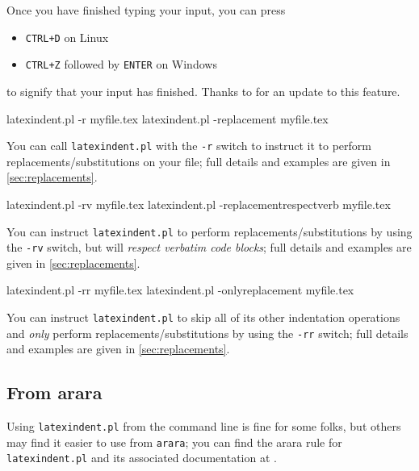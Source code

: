 	Once you have finished typing your input, you can press
	\begin{itemize}
		\item \texttt{CTRL+D} on Linux
		\item \texttt{CTRL+Z} followed by \texttt{ENTER} on Windows
	\end{itemize}
	to signify that your input has finished. Thanks to \cite{xu-cheng} for an update
	to this feature.
	\begin{commandshell}
latexindent.pl -r myfile.tex
latexindent.pl -replacement myfile.tex
\end{commandshell}
	You can%
	 call
	\texttt{latexindent.pl} with the \texttt{-r} switch to instruct it to perform
	replacements/substitutions on your file; full details and examples are given in
	\vref{sec:replacements}.

	\begin{commandshell}
latexindent.pl -rv myfile.tex
latexindent.pl -replacementrespectverb myfile.tex
\end{commandshell}
	You can%
	 instruct
	\texttt{latexindent.pl} to perform replacements/substitutions by using the
	\texttt{-rv} switch, but will \emph{respect verbatim code blocks}; full details and
	examples are given in \vref{sec:replacements}.

	\begin{commandshell}
latexindent.pl -rr myfile.tex
latexindent.pl -onlyreplacement myfile.tex
\end{commandshell}
	You can%
	 instruct
	\texttt{latexindent.pl} to skip all of its other indentation operations and
	\emph{only} perform replacements/substitutions by using the
	\texttt{-rr} switch; full details and examples are given in
	\vref{sec:replacements}.

\subsection{From arara}\label{sec:arara}
	Using \texttt{latexindent.pl} from the command line is fine for some folks, but others
	may find it easier to use from \texttt{arara}; you can find the arara rule for
	\texttt{latexindent.pl} and its associated documentation at \cite{paulo}.
